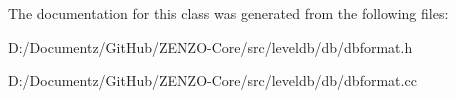 The documentation for this class was generated from the following files\+:\begin{DoxyCompactItemize}
\item 
D\+:/\+Documentz/\+Git\+Hub/\+Z\+E\+N\+Z\+O-\/\+Core/src/leveldb/db/dbformat.\+h\item 
D\+:/\+Documentz/\+Git\+Hub/\+Z\+E\+N\+Z\+O-\/\+Core/src/leveldb/db/dbformat.\+cc\end{DoxyCompactItemize}
